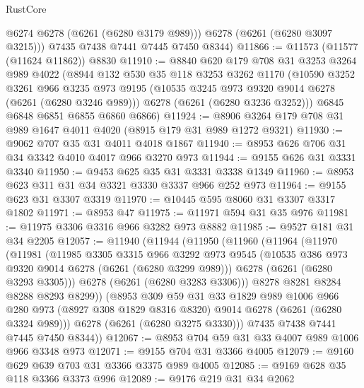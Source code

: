 \begin{lexlean}{RustCore}
\begin{coremodule}
          @6274
          @6278
          (@6261 (@6280 @3179 @989)))
        @6278
        (@6261 (@6280 @3097 @3215)))
      @7435
      @7438
      @7441
      @7445
      @7450
      @8344)
@11866 := @11573 (@11577 (@11624 @11862)) @8830
@11910 := @8840
    @620
    @179
    @708
    @31
    @3253
    @3264
    @989
    @4022
    (@8944
      @132
      @530
      @35
      @118
      @3253
      @3262
      @1170
      (@10590
        @3252
        @3261
        @966
        @3235
        @973
        @9195
        (@10535 @3245 @973 @9320 @9014 @6278 (@6261 (@6280 @3246 @989)))
        @6278
        (@6261 (@6280 @3236 @3252)))
      @6845
      @6848
      @6851
      @6855
      @6860
      @6866)
@11924 := @8906 @3264 @179 @708 @31 @989 @1647 @4011 @4020 (@8915 @179 @31 @989 @1272 @9321)
@11930 := @9062 @707 @35 @31 @4011 @4018 @1867
@11940 := @8953 @626 @706 @31 @34 @3342 @4010 @4017 @966 @3270 @973
@11944 := @9155 @626 @31 @3331 @3340
@11950 := @9453 @625 @35 @31 @3331 @3338 @1349
@11960 := @8953 @623 @311 @31 @34 @3321 @3330 @3337 @966 @252 @973
@11964 := @9155 @623 @31 @3307 @3319
@11970 := @10445 @595 @8060 @31 @3307 @3317 @1802
@11971 := @8953 @47
@11975 := @11971 @594 @31 @35 @976
@11981 := @11975 @3306 @3316 @966 @3282 @973 @8882
@11985 := @9527 @181 @31 @34 @2205
@12057 := @11940
    (@11944
      (@11950
        (@11960
          (@11964
            (@11970
              (@11981
                (@11985
                  @3305
                  @3315
                  @966
                  @3292
                  @973
                  @9545
                  (@10535 @386 @973 @9320 @9014 @6278 (@6261 (@6280 @3299 @989)))
                  @6278
                  (@6261 (@6280 @3293 @3305)))
                @6278
                (@6261 (@6280 @3283 @3306)))
              @8278
              @8281
              @8284
              @8288
              @8293
              @8299))
          (@8953
            @309
            @59
            @31
            @33
            @1829
            @989
            @1006
            @966
            @280
            @973
            (@8927 @308 @1829 @8316 @8320)
            @9014
            @6278
            (@6261 (@6280 @3324 @989)))
          @6278
          (@6261 (@6280 @3275 @3330)))
        @7435
        @7438
        @7441
        @7445
        @7450
        @8344))
@12067 := @8953 @704 @59 @31 @33 @4007 @989 @1006 @966 @3348 @973
@12071 := @9155 @704 @31 @3366 @4005
@12079 := @9160 @629 @639 @703 @31 @3366 @3375 @989 @4005
@12085 := @9169 @628 @35 @118 @3366 @3373 @996
@12089 := @9176 @219 @31 @34 @2062

\end{coremodule}
\end{lexlean}
